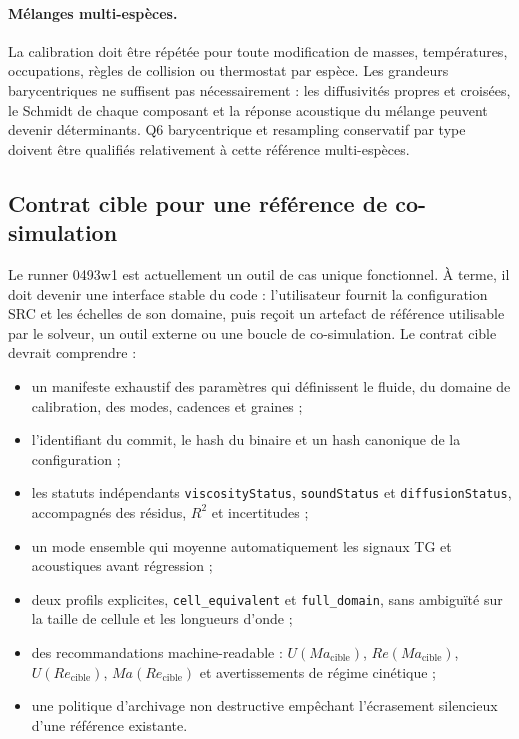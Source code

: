 \documentclass[11pt,a4paper]{article}
\begin{document}
\paragraph{Mélanges multi-espèces.}
La calibration doit être répétée pour toute modification de masses, températures, occupations, règles de collision ou thermostat par espèce. Les grandeurs barycentriques ne suffisent pas nécessairement : les diffusivités propres et croisées, le Schmidt de chaque composant et la réponse acoustique du mélange peuvent devenir déterminants. Q6 barycentrique et resampling conservatif par type doivent être qualifiés relativement à cette référence multi-espèces.

\subsection{Contrat cible pour une référence de co-simulation}

Le runner 0493w1 est actuellement un outil de cas unique fonctionnel. À terme, il doit devenir une interface stable du code : l'utilisateur fournit la configuration SRC et les échelles de son domaine, puis reçoit un artefact de référence utilisable par le solveur, un outil externe ou une boucle de co-simulation. Le contrat cible devrait comprendre :
\begin{itemize}[leftmargin=*]
  \item un manifeste exhaustif des paramètres qui définissent le fluide, du domaine de calibration, des modes, cadences et graines ;
  \item l'identifiant du commit, le hash du binaire et un hash canonique de la configuration ;
  \item les statuts indépendants \texttt{viscosityStatus}, \texttt{soundStatus} et \texttt{diffusionStatus}, accompagnés des résidus, $R^2$ et incertitudes ;
  \item un mode ensemble qui moyenne automatiquement les signaux TG et acoustiques avant régression ;
  \item deux profils explicites, \texttt{cell\_equivalent} et \texttt{full\_domain}, sans ambiguïté sur la taille de cellule et les longueurs d'onde ;
  \item des recommandations machine-readable : $U(Ma_{\mathrm{cible}})$, $Re(Ma_{\mathrm{cible}})$, $U(Re_{\mathrm{cible}})$, $Ma(Re_{\mathrm{cible}})$ et avertissements de régime cinétique ;
  \item une politique d'archivage non destructive empêchant l'écrasement silencieux d'une référence existante.
\end{itemize}
\end{document}
